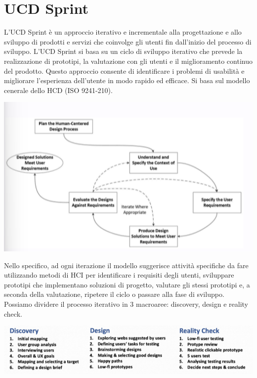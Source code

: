 \documentclass{report}
\begin{document}
	
	\chapter{UCD Sprint}
	L'UCD Sprint è un approccio iterativo e incrementale alla progettazione e allo sviluppo di prodotti e servizi che coinvolge gli utenti fin dall'inizio del processo di sviluppo. L'UCD Sprint si basa su un ciclo di sviluppo iterativo che prevede la realizzazione di prototipi, la valutazione con gli utenti e il miglioramento continuo del prodotto. Questo approccio consente di identificare i problemi di usabilità e migliorare l'esperienza dell'utente in modo rapido ed efficace. Si basa sul modello cenerale dello HCD (ISO 9241-210).
	\begin{center}
		\includegraphics[scale=0.5]{assets/ucd.png}
	\end{center}
	Nello specifico, ad ogni iterazione il modello suggerisce attività specifiche da fare utilizzando metodi di HCI per identificare i requisiti degli utenti, sviluppare prototipi che implementano soluzioni di progetto, valutare gli stessi prototipi e, a seconda della valutazione, ripetere il ciclo o passare alla fase di sviluppo.
	\vspace{\baselineskip}\\
	Possiamo dividere il processo iterativo in 3 macroaree: discovery, design e reality check.
	\begin{center}
		\includegraphics[scale=0.5]{assets/ucd2.png}
	\end{center}
\end{document}
